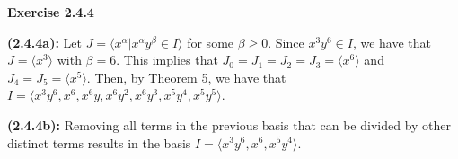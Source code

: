 \documentclass[12pt,oneside]{article}
\newenvironment{exercise}[1]{\vspace{.1in}\noindent\textbf{Exercise #1 \hspace{.05em}}}{}
\begin{document}

\begin{exercise}{2.4.4}

    \bigskip
    \textbf{(2.4.4a):}
    Let $J = \langle x^\alpha | x^\alpha y^\beta\in I \rangle$ for some $\beta \geq 0$.
    Since $x^3y^6 \in I$, we have that $J = \langle x^3 \rangle$ with $\beta = 6$.
    This implies that $J_0=J_1=J_2=J_3=\langle x^6 \rangle$ and $J_4=J_5=\langle x^5 \rangle$.
    Then, by Theorem 5, we have that $I=\langle x^3y^6,x^6,x^6y,x^6y^2,x^6y^3,x^5y^4,x^5y^5\rangle$.

    \bigskip
    \textbf{(2.4.4b):}
    Removing all terms in the previous basis that can be divided by other 
    distinct terms results in the basis $I = \langle x^3y^6,x^6,x^5y^4 \rangle$.

\end{exercise}


\end{document}
